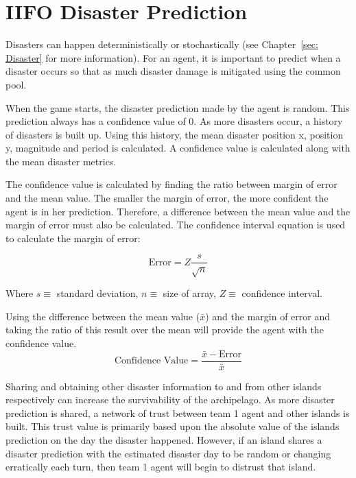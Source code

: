 \section{IIFO Disaster Prediction}
Disasters can happen deterministically or stochastically (see Chapter~\ref{sec: Disaster} for more information). For an agent, it is important to predict when a disaster occurs so that as much disaster damage is mitigated using the common pool.

When the game starts, the disaster prediction made by the agent is random. This prediction always has a confidence value of 0. As more disasters occur, a history of disasters is built up. Using this history, the mean disaster position x, position y, magnitude and period is calculated. A confidence value is calculated along with the mean disaster metrics.

The confidence value is calculated by finding the ratio between margin of error and the mean value. The smaller the margin of error, the more confident the agent is in her prediction. Therefore, a difference between the mean value and the margin of error must also be calculated. The confidence interval equation  is used to calculate the margin of error:

\begin{equation}
    \label{eq: Team1MarginOfError}
    \text{Error} = Z \dfrac{s}{\sqrt{n}}
\end{equation}

Where $s \equiv$ standard deviation, $n \equiv$ size of array, $Z \equiv$ confidence interval.

Using the difference between the mean value ($\bar{x}$) and the margin of error and taking the ratio of this result over the mean will provide the agent with the confidence value.
\begin{equation}
    \text{Confidence Value} = \frac{\bar{x} - \text{Error}}{\bar{x}}
\end{equation}

Sharing and obtaining other disaster information to and from other islands respectively can increase the survivability of the archipelago. As more disaster prediction is shared, a network of trust between team 1 agent and other islands is built. This trust value is primarily based upon the absolute value of the islands prediction on the day the disaster happened. However, if an island shares a disaster prediction with the estimated disaster day to be random or changing erratically each turn, then team 1 agent will begin to distrust that island.

